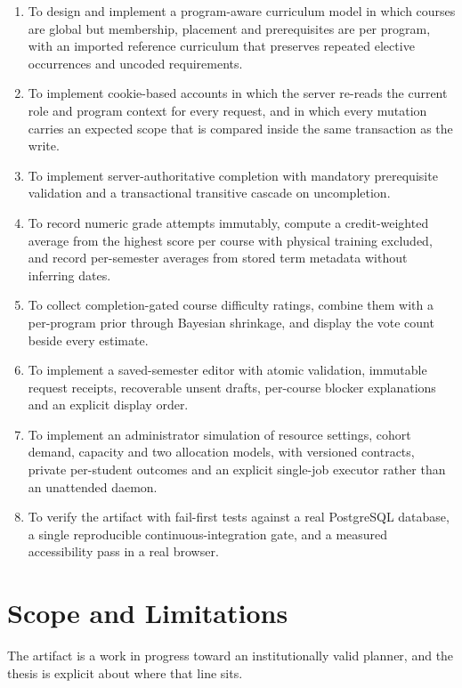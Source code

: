 \begin{enumerate}
  \item To design and implement a program-aware curriculum model in which courses are global but
        membership, placement and prerequisites are per program, with an imported reference
        curriculum that preserves repeated elective occurrences and uncoded requirements.
  \item To implement cookie-based accounts in which the server re-reads the current role and
        program context for every request, and in which every mutation carries an expected scope
        that is compared inside the same transaction as the write.
  \item To implement server-authoritative completion with mandatory prerequisite validation and a
        transactional transitive cascade on uncompletion.
  \item To record numeric grade attempts immutably, compute a credit-weighted average from the
        highest score per course with physical training excluded, and record per-semester averages
        from stored term metadata without inferring dates.
  \item To collect completion-gated course difficulty ratings, combine them with a per-program
        prior through Bayesian shrinkage, and display the vote count beside every estimate.
  \item To implement a saved-semester editor with atomic validation, immutable request receipts,
        recoverable unsent drafts, per-course blocker explanations and an explicit display order.
  \item To implement an administrator simulation of resource settings, cohort demand, capacity and
        two allocation models, with versioned contracts, private per-student outcomes and an
        explicit single-job executor rather than an unattended daemon.
  \item To verify the artifact with fail-first tests against a real PostgreSQL database, a single
        reproducible continuous-integration gate, and a measured accessibility pass in a real
        browser.
\end{enumerate}

\section{Scope and Limitations}

The artifact is a work in progress toward an institutionally valid planner, and the thesis is
explicit about where that line sits.


